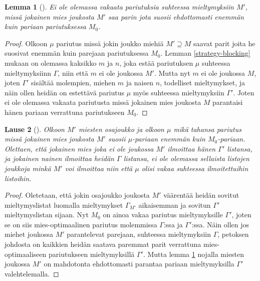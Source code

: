 \documentclass[finnish]{tktltiki2}
\newtheorem{lau}{Lause}
\newtheorem{lem}[lau]{Lemma}
\theoremstyle{definition}
\theoremstyle{remark}
\begin{document}
\begin{lem}[\cite{gusfield1989stable}]\label{strategy-gus}
	Ei ole olemassa vakaata pariutuksia suhteessa mieltymyksiin $M'$, missä jokainen mies joukosta $M'$ saa parin jota suosii ehdottomasti enemmän kuin pariaan pariutuksessa $M_0$.
\end{lem}

\begin{proof}
	Olkoon $\mu$ pariutus missä jokin joukko miehiä $M' \supseteq M$ saavat parit joita he suosivat enemmän kuin parejaan pariutuksessa $M_0$. Lemman \ref{strategy-blocking} mukaan on olemassa kaksikko $m$ ja $n$, joka estää pariutuksen $\mu$ suhteessa mieltymyksiinn $\Gamma$, niin että $m$ ei ole joukossa $M'$. Mutta nyt $m$ ei ole joukossa $M$, joten $\Gamma'$ sisältää molempien, miehen $m$ ja naisen $n$, todelliset mieltymykset, ja näin ollen heidän on estettävä pariutus $\mu$ myös suhteessa mieltymyksiin $\Gamma'$. Joten ei ole olemassa vakaata pariutusta missä jokainen mies joukosta $M$ parantaisi hänen pariaan verrattuna pariutukseen $M_0$. 
\end{proof}

\begin{lau}[\cite{gusfield1989stable}]
	Olkoon $M'$ miesten osajoukko ja olkoon $\mu$ mikä tahansa pariutus missä jokainen mies joukosta $M'$ suosii $\mu$-pariaan enemmän kuin $M_0$-pariaan. Olettaen, että jokainen mies joka ei ole joukossa $M'$ ilmoittaa hänen $\Gamma'$ listansa, ja jokainen nainen ilmoittaa heidän $\Gamma$ listansa, ei ole olemassa sellaista listojen joukkoja minkä $M'$ voi ilmoittaa niin että $\mu$ olisi vakaa suhteessa ilmoitettuihin listoihin.
\end{lau}

\begin{proof}
	Oletetaan, että jokin osajoukko joukosta $M'$ väärentää heidän sovitut mieltymyslistat luomalla mieltymykset $\Gamma_{M'}$ aikaisemman ja sovitun $\Gamma'$ mieltymyslistan sijaan. Nyt $M_0$ on ainoa vakaa pariutus mieltymyksille $\Gamma'$, joten se on siis mies-optimaalinen pariutus molemmissa $\Gamma$:ssa ja $\Gamma'$:ssa. Näin ollen jos miehet joukossa $M'$ parantelevat parejaan, suhteessa mieltymyksiin $\Gamma$, petoksen johdosta on kaikkien heidän saatava paremmat parit verrattuna mies-optimaaliseen pariutukseen mieltymyksillä $\Gamma'$. Mutta lemma \ref{strategy-gus} nojalla miesten joukossa $M'$ on mahdotonta ehdottomasti parantaa pariaan mieltymyksilla $\Gamma'$ valehtelemalla.
\end{proof}


%
%
% 
%



\end{document}

